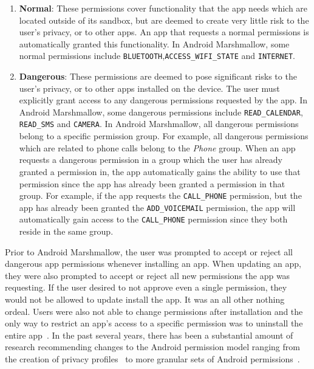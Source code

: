\documentclass{sig-alternate-05-2015}
\begin{document}
\begin{enumerate}
 \setlength{\itemsep}{.8pt} 
    \setlength{\parskip}{0pt} 
    \setlength{\parsep}{0pt}  


	\item \textbf{Normal}: These permissions cover functionality that the app needs which are located outside of its sandbox, but are deemed to create very little risk to the user's privacy, or to other apps. An app that requests a normal permissions is automatically granted this functionality. In Android Marshmallow, some normal permissions include \texttt{BLUETOOTH},\texttt{ACCESS\_WIFI\_STATE} and \texttt{INTERNET}. 
	\item \textbf{Dangerous}:  These permissions are deemed to pose significant risks to the user's privacy, or to other apps installed on the device. The user must explicitly grant access to any dangerous permissions requested by the app.  In Android Marshmallow, some dangerous permissions include \texttt{READ\_CALENDAR}, \texttt{READ\_SMS} and \texttt{CAMERA}. In Android Marshmallow, all dangerous permissions belong to a specific permission group. For example, all dangerous permissions which are related to phone calls belong to the \emph{Phone} group. When an app requests a dangerous permission in a group which the user has already granted a permission in, the app automatically gains the ability to use that permission since the app has already been granted a permission in that group. For example, if the app requests the \texttt{CALL\_PHONE} permission, but the app has already been granted the \texttt{ADD\_VOICEMAIL} permission, the app will automatically gain access to the \texttt{CALL\_PHONE} permission since they both reside in the same group.

\end{enumerate}

Prior to Android Marshmallow, the user was prompted to accept or reject all dangerous app permissions whenever installing an app. When updating an app, they were also prompted to accept or reject all new permissions the app was requesting. If the user desired to not approve even a single permission, they would not be allowed to update install the app. It was an all other nothing ordeal. Users were also not able to change permissions after installation and the only way to restrict an app's access to a specific permission was to uninstall the entire app~\cite{Wijesekera:2015:APR:2831143.2831175}. In the past several years, there has been a substantial amount of research recommending changes to the Android permission model ranging from the creation of privacy profiles~\cite{Liu:2014:RMA:2566486.2568035} to more granular sets of Android permissions~\cite{7145666}.
\end{document}
